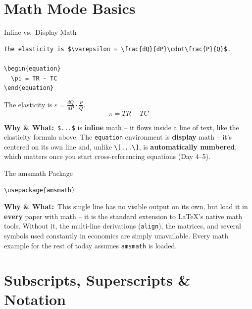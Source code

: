 \documentclass[11pt,aspectratio=169]{beamer}
\newcommand{\whybox}[1]{%
  \vspace{2pt}
  {\scriptsize\raggedright\textcolor{red!55!black}{\textbf{Why \& What:}}~#1\par}
}
\begin{document}
\section{Math Mode Basics}

\begin{frame}[fragile]{Inline vs.\ Display Math}
  \begin{lstlisting}
The elasticity is $\varepsilon = \frac{dQ}{dP}\cdot\frac{P}{Q}$.

\begin{equation}
  \pi = TR - TC
\end{equation}
  \end{lstlisting}
  \begin{outputbox}
    \small The elasticity is $\varepsilon = \frac{dQ}{dP}\cdot\frac{P}{Q}$.
    \vspace{6pt}
    \[ \pi = TR - TC \tag{1} \]
  \end{outputbox}
  \whybox{\texttt{\$...\$} is \textbf{inline} math -- it flows inside a
  line of text, like the elasticity formula above. The
  \texttt{equation} environment is \textbf{display} math -- it's
  centered on its own line and, unlike \texttt{\textbackslash[...\textbackslash]},
  is \textbf{automatically numbered}, which matters once you start
  cross-referencing equations (Day 4--5).}
\end{frame}

\begin{frame}[fragile]{The amsmath Package}
  \begin{lstlisting}
\usepackage{amsmath}
  \end{lstlisting}
  \whybox{This single line has no visible output on its own, but load
  it in \textbf{every} paper with math -- it is the standard extension
  to LaTeX's native math tools. Without it, the multi-line derivations
  (\texttt{align}), the matrices, and several symbols used constantly
  in economics are simply unavailable. Every math example for the rest
  of today assumes \texttt{amsmath} is loaded.}
\end{frame}

\section{Subscripts, Superscripts \& Notation}
\end{document}
